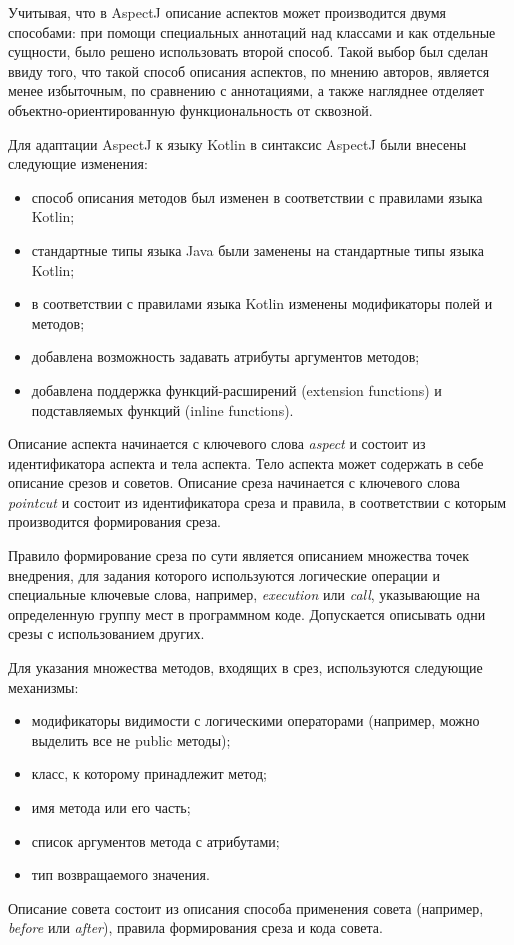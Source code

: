 \documentclass[conference]{IEEEtran}
\begin{document}
Учитывая, что в AspectJ описание аспектов может производится двумя способами:
при помощи специальных аннотаций над классами и как отдельные сущности, было
решено использовать второй способ.
Такой выбор был сделан ввиду того, что такой способ описания аспектов, по мнению
авторов, является менее избыточным, по сравнению с аннотациями, а также
нагляднее отделяет объектно-ориентированную функциональность от сквозной.

Для адаптации AspectJ к языку Kotlin в синтаксис AspectJ были внесены следующие
изменения:
\begin{itemize}
	\item способ описания методов был изменен в соответствии с правилами языка
	      Kotlin;
	\item стандартные типы языка Java были заменены на стандартные типы языка
		  Kotlin;
	\item в соответствии с правилами языка Kotlin изменены модификаторы полей и
	      методов;
	\item добавлена возможность задавать атрибуты аргументов методов;
	\item добавлена поддержка функций-расширений (extension functions) и
	      подставляемых  функций (inline functions).
\end{itemize}

Описание аспекта начинается с ключевого слова \textit{aspect} и состоит из 
идентификатора аспекта и тела аспекта.
Тело аспекта может содержать в себе описание срезов и советов.
Описание среза начинается с ключевого слова \textit{pointcut} и состоит из
идентификатора среза и правила, в соответствии с которым производится
формирования среза.

Правило формирование среза по сути является описанием множества точек внедрения, 
для задания которого используются логические операции и специальные ключевые 
слова, например, \textit{execution} или \textit{call}, указывающие на
определенную группу мест в программном коде.
Допускается описывать одни срезы с использованием других. 

Для указания множества методов, входящих в срез, используются следующие
механизмы:
\begin{itemize}
    \item модификаторы видимости с логическими операторами (например, можно
          выделить все не public методы);
    \item класс, к которому принадлежит метод;
    \item имя метода или его часть;
    \item список аргументов метода с атрибутами;
    \item тип возвращаемого значения.
\end{itemize}
Описание совета состоит из описания способа применения совета (например,
\textit{before} или \textit{after}), правила формирования среза и кода совета.
\end{document}
